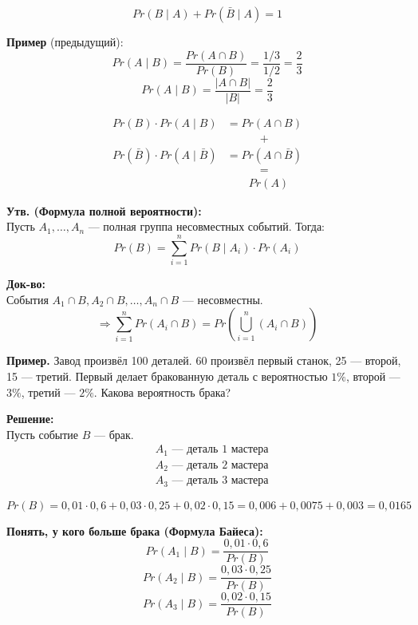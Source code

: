 \documentclass[10pt, a4paper]{article}
\begin{document}
\[
Pr(B \mid A) + Pr(\bar{B} \mid A) = 1
\]

\vspace{1em}
\noindent
\textbf{Пример }(предыдущий):
\[
Pr(A \mid B) = \frac{Pr(A \cap B)}{Pr(B)} = \frac{1/3}{1/2} = \frac{2}{3}
\]
\[
Pr(A \mid B) = \frac{|A \cap B|}{|B|} = \frac{2}{3}
\]


\noindent
\begin{align*}
Pr(B) \cdot Pr(A \mid B) &= Pr(A \cap B) \\
&\quad\qquad + \\
Pr(\bar{B}) \cdot Pr(A \mid \bar{B}) &= Pr(A \cap \bar{B}) \\
&\quad\qquad = \\
&\quad\quad Pr(A)
\end{align*}

\noindent
\textbf{Утв. (Формула полной вероятности):} \\
Пусть $A_1, \dots, A_n$ — полная группа несовместных событий. Тогда:
\[
Pr(B) = \sum_{i=1}^{n} Pr(B \mid A_i) \cdot Pr(A_i)
\]

\vspace{0.5em}
\noindent
\textbf{Док-во:} \\
События $A_1 \cap B, A_2 \cap B, \dots, A_n \cap B$ — несовместны.
\[
\Rightarrow \sum_{i=1}^{n} Pr(A_i \cap B) = Pr\left(\bigcup_{i=1}^{n} (A_i \cap B)\right)
\]

\vspace{1.5em}
\noindent
\textbf{Пример.} Завод произвёл 100 деталей. 
60 произвёл первый станок, 25 — второй, 15 — третий. 
Первый делает бракованную деталь с вероятностью $1\%$, второй — $3\%$, третий — $2\%$. 
Какова вероятность брака?

\vspace{0.5em}
\noindent
\textbf{Решение:} \\
Пусть событие $B$ — брак.
\begin{align*}
& A_1 \text{ — деталь 1 мастера} \\
& A_2 \text{ — деталь 2 мастера} \\
& A_3 \text{ — деталь 3 мастера}
\end{align*}

\[
Pr(B) = 0{,}01 \cdot 0{,}6 + 0{,}03 \cdot 0{,}25 + 0{,}02 \cdot 0{,}15 = 0{,}006 + 0{,}0075 + 0{,}003 = 0{,}0165\]

\noindent
\textbf{Понять, у кого больше брака (Формула Байеса):}
\[
Pr(A_1 \mid B) = \frac{0{,}01 \cdot 0{,}6}{Pr(B)}
\]
\[
Pr(A_2 \mid B) = \frac{0{,}03 \cdot 0{,}25}{Pr(B)}
\]
\[
Pr(A_3 \mid B) = \frac{0{,}02 \cdot 0{,}15}{Pr(B)}
\]
\end{document}
